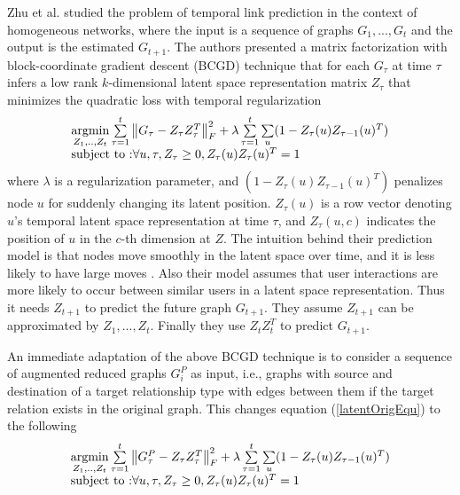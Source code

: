 Zhu et al. \cite{Zhu2016} studied the problem of temporal link prediction in the context of homogeneous networks, where the input is a sequence of graphs $G_1, ..., G_t$ and the output is the estimated $G_{t+1}$. The authors presented a matrix factorization with block-coordinate gradient descent (BCGD) technique that for each $G_\tau$ at time $\tau$ infers a low rank $k$-dimensional latent space representation matrix $Z_\tau$ that minimizes the quadratic loss with temporal regularization
\begin{equation}\label{latentOrigEqu}
    \begin{array}{l}
\operatorname*{argmin}\limits_{Z_1, .., Z_t}\sum\limits_{\tau=1}^{t}\left \| G_\tau-Z_{\tau}Z_{\tau}^T \right \|^2_F+\lambda \sum\limits_{\tau=1}^{t}\sum\limits_{u}(1-Z_{\tau}(u)Z_{\tau-1}(u)^T) 
\\
\text{subject to :} \forall u,\tau,Z_{\tau}\geq 0, Z_{\tau}(u)Z_{\tau}(u)^T=1
    \end{array}
\end{equation}
where $\lambda$ is a regularization parameter, and  $(1-Z_{\tau}(u)Z_{\tau-1}(u)^T)$ penalizes node $u$ for suddenly changing its latent position. %
$Z_\tau(u)$ is a row vector denoting $u$'s temporal latent space representation at time $\tau$, and $Z_\tau(u,c)$ indicates the position of $u$ in the $c$-th dimension at $Z$. The intuition behind their prediction model is that nodes move smoothly in the latent space over time, and it is less likely to have large moves \cite{sarkar2005dynamic,zhang2014inferring}. Also their model assumes that user interactions are more likely to occur between similar users in a latent space representation. Thus it needs $Z_{t+1}$ to predict the future graph $G_{t+1}$. They assume $Z_{t+1}$ can be approximated by $Z_1, ..., Z_t$. Finally they use $Z_tZ_t^T$ to predict $G_{t+1}$.



An immediate adaptation of the above BCGD technique is to consider a sequence of augmented reduced graphs $G^P_i$ as input, i.e., graphs with source and destination of a target relationship type with edges between them if the target relation exists in the original graph. This changes equation (\ref{latentOrigEqu}) to the following
\begin{equation}\label{latentReducedEqu}
    \begin{array}{l}
\operatorname*{argmin}\limits_{Z_1, .., Z_t}\sum\limits_{\tau=1}^{t}\left \| G^{P}_\tau-Z_{\tau}Z_{\tau}^T \right \|^2_F+\lambda \sum\limits_{\tau=1}^{t}\sum\limits_{u}(1-Z_{\tau}(u)Z_{\tau-1}(u)^T) 
\\
\text{subject to :} \forall u,\tau,Z_{\tau}\geq 0, Z_{\tau}(u)Z_{\tau}(u)^T=1
    \end{array}
\end{equation}


